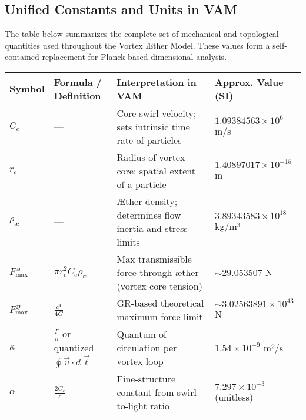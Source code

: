 \subsection*{Unified Constants and Units in VAM}

The table below summarizes the complete set of mechanical and topological quantities used throughout the Vortex Æther Model. These values form a self-contained replacement for Planck-based dimensional analysis.


\begin{table}[H]
    \centering
    \footnotesize
    \renewcommand{\arraystretch}{1.3}
    \begin{tabular}{|l|l|l|l|}
        \hline
        \textbf{Symbol} & \textbf{Formula / Definition} & \textbf{Interpretation in VAM} & \textbf{Approx. Value (SI)} \\
        \hline

        $C_e$ &
        — &
        Core swirl velocity; sets intrinsic time rate of particles &
        $1.09384563 \times 10^6$ m/s \\
        \hline

        $r_c$ &
        — &
        Radius of vortex core; spatial extent of a particle &
        $1.40897017 \times 10^{-15}$ m \\
        \hline

        $\rho_\text{\ae}$ &
        — &
        Æther density; determines flow inertia and stress limits &
        $3.89343583 \times 10^{18}$ kg/m³ \\
        \hline

        $F^{\text{\ae}}_{\text{max}}$ &
        $\pi r_c^2 C_e \rho_\text{\ae}$ &
        Max transmissible force through æther (vortex core tension) &
        $\sim 29.053507$ N \\
        \hline

        $F^\text{gr}_\text{max}$ &
        $\frac{c^4}{4G}$ &
        GR-based theoretical maximum force limit &
        $\sim 3.02563891 \times 10^{43}$ N \\
        \hline

        $\kappa$ &
        $\frac{\Gamma}{n}$ or quantized $\oint \vec{v} \cdot d\vec{\ell}$ &
        Quantum of circulation per vortex loop &
        $1.54 \times 10^{-9}$ m²/s \\
        \hline

        $\alpha$ &
        $\frac{2 C_e}{c}$ &
        Fine-structure constant from swirl-to-light ratio &
        $7.297 \times 10^{-3}$ (unitless) \\
        \hline


\end{tabular}
\end{table}
